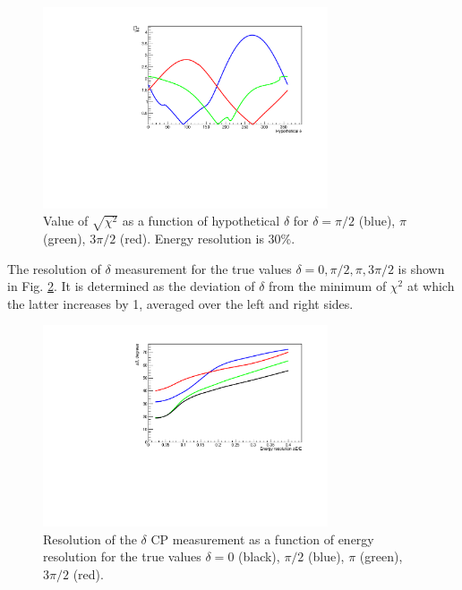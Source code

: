 \documentclass[prd,showpacs,groupedaddress,superscriptaddress,amsmath,amssymb]{revtex4-2} %
\begin{document}
\begin{figure}[h]
\begin{center}
\includegraphics[width=0.75\textwidth]{del.pdf}
\caption {Value of $\sqrt{\chi^2}$ as a function of hypothetical $\delta$ for $\delta = \pi/2$ (blue), $\pi$ (green), $3\pi/2$ (red). Energy resolution is 30\%.
\label{fig:del}}
\end{center} 
\end{figure}

 The resolution of $\delta$ measurement for the true values $\delta = 0, \pi/2, \pi, 3\pi/2$ is shown in Fig. \ref{fig:del_delres_eres}. It is determined
as the deviation of $\delta$ from the minimum of $\chi^2$ at which the latter increases by 1, averaged over the left and right sides.

\begin{figure}[h]
\begin{center}
\includegraphics[width=0.75\textwidth]{del_delres_eres.pdf}
\caption {Resolution of the $\delta$ CP measurement as a function of energy resolution for the true values $\delta = 0$ (black), $\pi/2$ (blue),
$\pi$ (green), $3\pi/2$ (red).
\label{fig:del_delres_eres}}
\end{center}
\end{figure}
\end{document}
